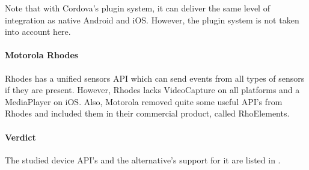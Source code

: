 Note that with Cordova's plugin system, it can deliver the same level of integration as native Android and iOS. However, the plugin system is not taken into account here. 

\paragraph{Motorola Rhodes} Rhodes has a unified sensors API which can send events from all types of sensors if they are present. However, Rhodes lacks VideoCapture on all platforms and a MediaPlayer on iOS. Also, Motorola removed quite some useful API's from Rhodes and included them in their commercial product, called RhoElements.

\paragraph{Verdict} The studied device API's and the alternative's support for it are listed in .

